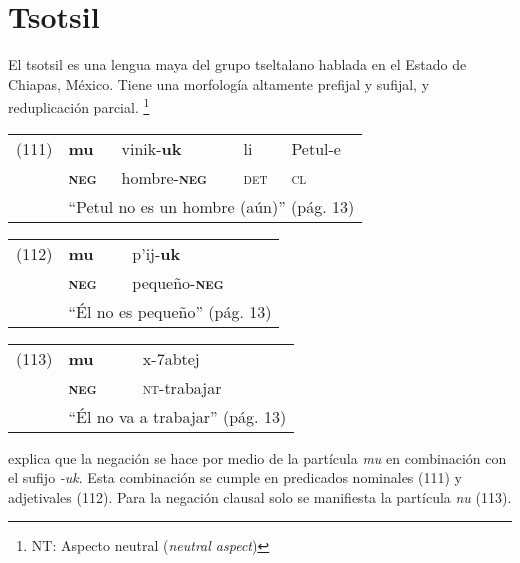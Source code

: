 \section*{Tsotsil}

\noindent El tsotsil es una lengua maya del grupo tseltalano hablada en el Estado de Chiapas, México. Tiene una morfología altamente prefijal y sufijal, y reduplicación parcial.
\footnote{NT: Aspecto neutral (\textit{neutral aspect})}
\vspace{0.5cm}

{\setmainfont{Charis SIL}

\begin{tabular}{lllll}
(111) & \textbf{mu} & vinik-\textbf{uk} & li & Petul-e \\
& \textsc{\textbf{neg}} & hombre-\textsc{\textbf{neg}} & \textsc{det} & \textsc{cl} \\
& \multicolumn{4}{l}{``Petul no es un hombre (aún)'' (pág. 13)}
\end{tabular} \vspace{0.5cm}

\begin{tabular}{lll}
(112) & \textbf{mu} & p'ij-\textbf{uk} \\
& \textsc{\textbf{neg}} & pequeño-\textsc{\textbf{neg}} \\
& \multicolumn{2}{l}{``Él no es pequeño'' (pág. 13)}
\end{tabular} \vspace{0.5cm}

\begin{tabular}{lll}
(113) & \textbf{mu} & x-7abtej \\
& \textsc{\textbf{neg}} & \textsc{nt}-trabajar \\
& \multicolumn{2}{l}{``Él no va a trabajar'' (pág. 13)}
\end{tabular} \vspace{0.5cm}

}

\textcolor{MidnightBlue}{\citet{Tzotzil}} explica que la negación se hace por medio de la partícula {\setmainfont{Charis SIL} \textit{mu}} en combinación con el sufijo {\setmainfont{Charis SIL} \textit{-uk}}. Esta combinación se cumple en predicados nominales (111) y adjetivales (112). Para la negación clausal solo se manifiesta la partícula {\setmainfont{Charis SIL} \textit{nu}} (113).
